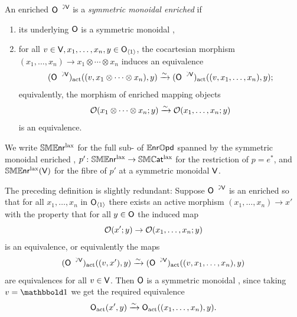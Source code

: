 \documentclass[a4paper,11pt]{article}
\begin{document}
\begin{defn}
  An enriched \iopd{} $\uract{O}{V}$ is a \emph{symmetric monoidal
    enriched \icat{}} if
  \begin{enumerate}[(1)]
  \item its underlying \iopd{} $\textup{\textsf{O}}$ is a symmetric monoidal
    \icat{},
  \item for all
    $v \in \textup{\textsf{V}}, x_{1},\ldots,x_{n},y \in \textup{\textsf{O}}_{\langle 1 \rangle}$, the
    cocartesian morphism $(x_{1},\dots,x_{n}) \to x_{1} \otimes \cdots
    \otimes x_{n}$ induces an equivalence
    \[ (\uract{O}{V})_{\act}((v, x_{1} \otimes \cdots \otimes x_{n}),
      y) \isoto (\uract{O}{V})_{\act}((v, x_{1}, \dots, x_{n}),
      y);\]
    equivalently, the morphism of enriched mapping objects
    \[ \eO(x_{1}\otimes \cdots \otimes x_{n}; y) \isoto
      \eO(x_{1},\ldots,x_{n}; y)\]
    is an equivalence.
  \end{enumerate}
  We write $\mathbb{SME}\mkern-0.5mu\textsf{\textup{nr}}^{\text{\textup{lax}}}$ for the full sub-\itcat{} of $\mathbb{E}\mkern-0.5mu\textsf{\textup{nr}}\mathbb{O}\mkern-0.5mu\textsf{\textup{pd}}$ spanned by
  the symmetric monoidal enriched \icats{},
  $p' \colon \SMENRl \to \SMCATl$ for the restriction of $p = e^{*}$,
  and $\mathbb{SME}\mkern-0.5mu\textsf{\textup{nr}}^{\text{\textup{lax}}}(\textup{\textsf{V}})$ for the fibre of $p'$ at a symmetric monoidal
  \icat{} $\textup{\textsf{V}}$.
\end{defn}

\begin{observation}\label{obs:esm simplify}
  The preceding definition is slightly redundant: Suppose
  $\uract{O}{V}$ is an enriched \iopd{} so that for all
  $x_{1},\dots,x_{n}$ in $\textup{\textsf{O}}_{\langle 1 \rangle}$ there exists an active
  morphism $(x_{1},\dots,x_{n}) \to x'$ with the property that for all
  $y \in \textup{\textsf{O}}$ the induced map
  \[ \eO(x'; y) \to
    \eO(x_{1},\ldots,x_{n}; y)\]
  is an equivalence, or equivalently the maps
  \[ (\uract{O}{V})_{\act}((v, x'),
    y) \isoto (\uract{O}{V})_{\act}((v, x_{1}, \dots, x_{n}),
    y)\]
  are equivalences for all $v \in \textup{\textsf{V}}$. Then $\textup{\textsf{O}}$ is a symmetric
  monoidal \icat{}, since taking $v = \bbone$ we get the required
  equivalence
  \[ \oO_{\act}(x', y) \isoto\oO_{\act}((x_{1},\dots,x_{n}), y).\]
\end{observation}
\end{document}
